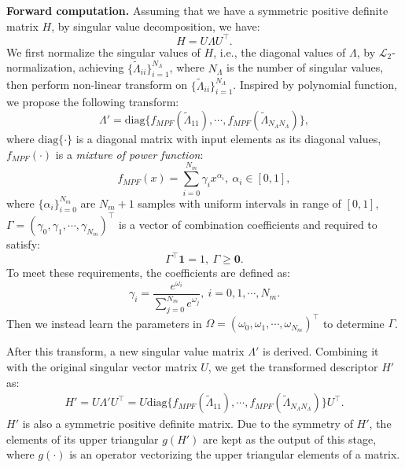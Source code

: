 \documentclass[runningheads]{llncs}
\begin{document}
\noindent
\textbf{Forward computation.}  Assuming that we have a symmetric positive definite matrix $H$, by singular value decomposition, we have:
\begin{equation}
H = U\Lambda U^\top.
\end{equation}
We first normalize the singular values of $H$, i.e., the diagonal values of $\Lambda$, by $\mathcal{L}_2$-normalization, achieving $\{\tilde{\Lambda}_{ii}\}_{i=1}^{N_{\Lambda}}$, where $N_{\Lambda}$ is the number of singular values, then perform non-linear transform on $\{\tilde{\Lambda}_{ii}\}_{i=1}^{N_{\Lambda}}$. Inspired by polynomial function, we propose the following transform:
\begin{equation}
\Lambda'= \mbox{diag} \{f_{MPF}(\tilde{\Lambda}_{11}), \cdots, f_{MPF}(\tilde{\Lambda}_{N_{\Lambda}N_{\Lambda}})\},
\end{equation}
where $\mbox{diag}\{\cdot\}$ is a diagonal matrix with input elements as its diagonal values, $f_{MPF}(\cdot)$ is a \emph{mixture of power function}:
\begin{equation}
f_{MPF}(x)= \sum_{i=0}^{N_m}\gamma_{i} x^{\alpha_i},~\alpha_i\in [0,1],
\end{equation}
where  $\{\alpha_i\}_{i=0}^{N_m}$ are $N_m+1$ samples with uniform intervals  in range of $[0,1]$, $\Gamma = (\gamma_0,\gamma_1,\cdots,\gamma_{N_m})^{\top}$ is a vector of combination coefficients and required to satisfy:
\begin{equation}
\Gamma^\top \mathbf{1}  = 1,~\Gamma\geq \mathbf{0}.
\label{eqn:norm}
\end{equation} 
To meet these requirements, the coefficients are defined as:
\begin{equation}
\gamma_i = \frac{e^{\omega_i}}{\sum_{j=0}^{N_m}e^{\omega_j}},~i=0,1,\cdots,N_m.
\end{equation}
Then we instead learn the parameters in $\Omega=(\omega_0,\omega_1,\cdots,\omega_{N_m})^{\top}$ to determine $\Gamma$.

After this transform, a new singular value matrix $\Lambda'$ is derived. Combining it with the original singular vector matrix $U$, we get the transformed descriptor $H'$ as:
\begin{equation}
\begin{split}
H' = U \Lambda' U^{\top} =  U \mbox{diag} \{f_{MPF}(\tilde{\Lambda}_{11}), \cdots, f_{MPF}(\tilde{\Lambda}_{N_{\Lambda}N_{\Lambda}})\} U^{\top}.
\end{split}
\end{equation}
$H'$ is also a symmetric positive definite matrix. Due to the symmetry of $H'$, the elements of its upper triangular $g(H')$ are kept as the output of this stage, where $g(\cdot)$ is an operator vectorizing the upper triangular elements of a matrix. 
\end{document}
